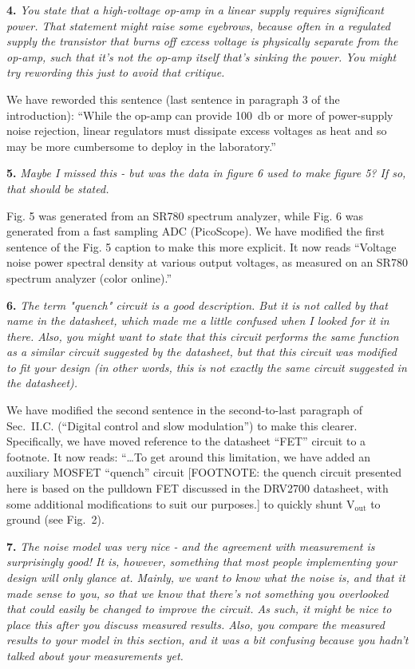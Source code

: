 \documentclass[12pt, oneside]{letter}   	%
\begin{document}
\textbf{4.}
\textit{You state that a high-voltage op-amp in a linear supply requires significant power.
That statement might raise some eyebrows, because often in a regulated supply the transistor that burns off excess voltage is physically separate from the op-amp, such that it's not the op-amp itself that's sinking the power. 
You might try rewording this just to avoid that critique.}

We have reworded this sentence (last sentence in paragraph 3 of the introduction): ``While the op-amp can provide \SI{100}{\decibel} or more of power-supply noise rejection, linear regulators must dissipate excess voltages as heat and so may be more cumbersome to deploy in the laboratory.''


\textbf{5.}
\textit{Maybe I missed this - but was the data in figure 6 used to make figure 5? If so, that should be stated.}

Fig. 5 was generated from an SR780 spectrum analyzer, while Fig. 6 was generated from a fast sampling ADC (PicoScope).
We have modified the first sentence of the Fig. 5 caption to make this more explicit.
It now reads ``Voltage noise power spectral density at various output voltages, as measured on an SR780 spectrum analyzer (color online).''  

\textbf{6.}
\textit{The term "quench" circuit is a good description. But it is not called by that name in the datasheet, which made me a little confused when I looked for it in there. Also, you might want to state that this circuit performs the same function as a similar circuit suggested by the datasheet, but that this circuit was modified to fit your design (in other words, this is not exactly the same circuit suggested in the datasheet).}

We have modified the second sentence in the second-to-last paragraph of Sec.~II.C. (``Digital control and slow modulation'') to make this clearer.
Specifically, we have moved reference to the datasheet ``FET'' circuit to a footnote.
It now reads: ``\ldots To get around this limitation, we have added an auxiliary MOSFET ``quench'' circuit [FOOTNOTE: the quench circuit presented here is based on the pulldown FET discussed in the DRV2700 datasheet, with some additional modifications to suit our purposes.] to quickly shunt $\text{V}_\text{out}$ to ground (see Fig.~2).


\textbf{7.}
\textit{The noise model was very nice - and the agreement with measurement is surprisingly good! It is, however, something that most people implementing your design will only glance at. Mainly, we want to know what the noise is, and that it made sense to you, so that we know that there's not something you overlooked that could easily be changed to improve the circuit. As such, it might be nice to place this after you discuss measured results. Also, you compare the measured results to your model in this section, and it was a bit confusing because you hadn't talked about your measurements yet.}
\end{document}
